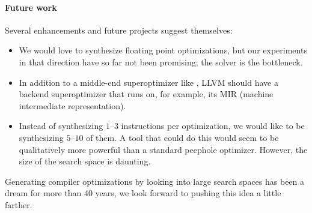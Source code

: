 \paragraph{Future work}
%
Several enhancements and future projects suggest themselves:
%
\begin{itemize}
\item
We would love to synthesize floating point optimizations, but our
experiments in that direction have so far not been promising; the
solver is the bottleneck.
\item
In addition to a middle-end superoptimizer like \tool{}, LLVM should
have a backend superoptimizer that runs on, for example, its MIR
(machine intermediate representation).
\item
Instead of synthesizing $1$--$3$ instructions per optimization, we would
like to be synthesizing $5$--$10$ of them.
%
A tool that could do this would seem to be qualitatively more powerful
than a standard peephole optimizer.
%
However, the size of the search space is daunting.
\end{itemize}
%
Generating compiler optimizations by looking into large search spaces
has been a dream for more than 40 years, we look forward to pushing
this idea a little farther.
\fi

